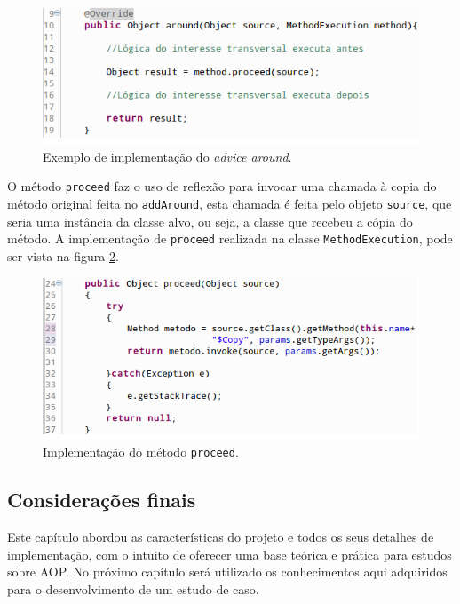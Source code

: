 \documentclass[tc,oneside]{iiufrgs}
\begin{document}
\begin{figure}[ht]
	\centering
	\includegraphics[scale=0.5]{figuras/implementacao/exemplo_proceed.png}
	\caption{Exemplo de implementação do \textit{advice around}.}
	\label{fig:exemploproceed}
\end{figure}

O método \texttt{proceed} faz o uso de reflexão para invocar uma chamada à copia do método original feita no \texttt{addAround}, esta chamada é feita pelo objeto \texttt{source}, que seria uma instância da classe alvo, ou seja, a classe que recebeu a cópia do método. A implementação de \texttt{proceed} realizada na classe \texttt{MethodExecution}, pode ser vista na figura \ref{fig:proceed}. 

\begin{figure}[ht]
	\centering
	\includegraphics[scale=0.5]{figuras/implementacao/proceed.png}
	\caption{Implementação do método \texttt{proceed}.}
	\label{fig:proceed}
\end{figure}

\subsection{Considerações finais}

Este capítulo abordou as características do projeto e todos os seus detalhes de implementação, com o intuito de oferecer uma base teórica e prática para estudos sobre AOP. No próximo capítulo será utilizado os conhecimentos aqui adquiridos para o desenvolvimento de um estudo de caso.
\end{document}
